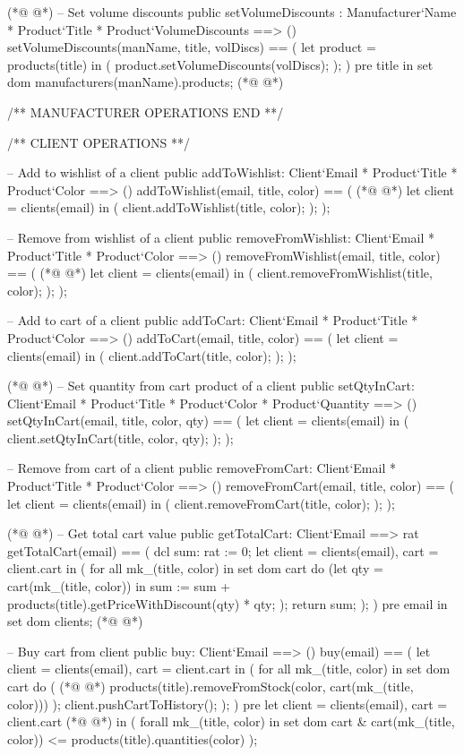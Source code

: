 \begin{vdmpp}[breaklines=true]
(*@
\label{addToCart:146}
@*)
  -- Set volume discounts
 public setVolumeDiscounts : Manufacturer`Name * Product`Title * Product`VolumeDiscounts ==> ()
 setVolumeDiscounts(manName, title, volDiscs) == (
 let product = products(title)
  in (
   product.setVolumeDiscounts(volDiscs);
  );
 )
 pre title in set dom manufacturers(manName).products;
(*@
\label{setQtyInCart:155}
@*)
 
 /** MANUFACTURER OPERATIONS END **/


 /** CLIENT OPERATIONS **/
 
 -- Add to wishlist of a client
 public addToWishlist: Client`Email * Product`Title * Product`Color ==> ()
 addToWishlist(email, title, color) == (
(*@
\label{removeFromCart:164}
@*)
  let client = clients(email)
  in (
   client.addToWishlist(title, color);
  );
 );
 
 -- Remove from wishlist of a client
 public removeFromWishlist: Client`Email * Product`Title * Product`Color ==> ()
 removeFromWishlist(email, title, color) == (
(*@
\label{getTotalCart:173}
@*)
  let client = clients(email)
  in (
   client.removeFromWishlist(title, color);
  );
 );
 
 -- Add to cart of a client
 public addToCart: Client`Email * Product`Title * Product`Color ==> ()
 addToCart(email, title, color) == (
  let client = clients(email)
  in (
   client.addToCart(title, color);
  );
 );
 
(*@
\label{buy:188}
@*)
 -- Set quantity from cart product of a client
 public setQtyInCart: Client`Email * Product`Title * Product`Color * Product`Quantity ==> ()
 setQtyInCart(email, title, color, qty) == (
  let client = clients(email)
  in (
   client.setQtyInCart(title, color, qty);
  );
 );
 
 -- Remove from cart of a client
 public removeFromCart: Client`Email * Product`Title * Product`Color ==> ()
 removeFromCart(email, title, color) == (
  let client = clients(email)
  in (
   client.removeFromCart(title, color);
  );
 );
 
(*@
\label{convertWishlist:206}
@*)
 -- Get total cart value
 public getTotalCart: Client`Email ==> rat
 getTotalCart(email) == (
  dcl sum: rat := 0;
  let client = clients(email), cart = client.cart
  in (
   for all mk_(title, color) in set dom cart
    do (let qty = cart(mk_(title, color))
     in sum := sum + products(title).getPriceWithDiscount(qty) * qty;
    );
   return sum;
  );
 )
 pre email in set dom clients;
(*@
\label{registerClient:220}
@*)
 
 -- Buy cart from client
 public buy: Client`Email ==> ()
 buy(email) == (
  let client = clients(email), cart = client.cart
  in (
   for all mk_(title, color) in set dom cart
    do (
(*@
\label{addClient:228}
@*)
     products(title).removeFromStock(color, cart(mk_(title, color)))
    );
   client.pushCartToHistory();
  );
 )
 pre let client = clients(email), cart = client.cart
(*@
\label{searchProductsByTitle:234}
@*)
  in (
   forall mk_(title, color) in set dom cart
    & cart(mk_(title, color)) <= products(title).quantities(color)
  );
 

\end{vdmpp}

